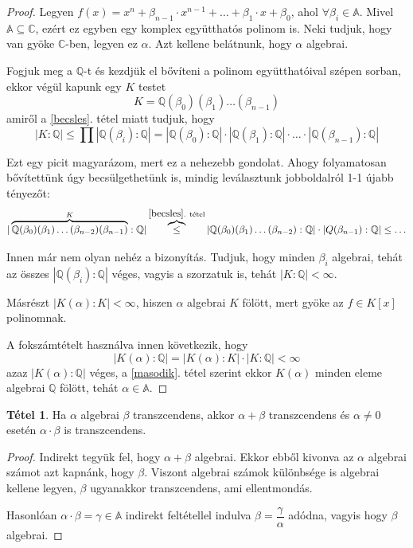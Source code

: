 \documentclass[12pt]{book}
\theoremstyle{plain} %
\theoremstyle{definition} %
\newtheorem{theo/}{Tétel}[section]
\newenvironment{theo}
  {\renewcommand{\qedsymbol}{$\clubsuit$}%
   \pushQED{\qed}\begin{theo/}}
  {\popQED\end{theo/}}
\theoremstyle{remark}
\renewcommand\qedsymbol{$\blacksquare$}
\numberwithin{equation}{section}  %
\begin{document}
\begin{proof}
		Legyen $f(x)=x^n+\beta_{n-1}\cdot x^{n-1} + \ldots + \beta_1 \cdot x + \beta_0$, ahol $\forall \beta_i \in \mathbb{A}$. Mivel $\mathbb{A} \subseteq \mathbb{C}$, ezért ez egyben egy komplex együtthatós polinom is. Neki tudjuk, hogy van gyöke $\mathbb{C}$-ben, legyen ez $\alpha$. Azt kellene belátnunk, hogy $\alpha$ algebrai.
		
		Fogjuk meg a $\mathbb{Q}$-t és kezdjük el bővíteni a polinom együtthatóival szépen sorban, ekkor végül kapunk egy $K$ testet
		\[ K = \mathbb{Q}(\beta_0)(\beta_1)\ldots(\beta_{n-1})   \]
		amiről a \ref{becsles}. tétel miatt tudjuk, hogy
		\[ |K:\mathbb{Q}| \leq \prod |\mathbb{Q}(\beta_i):\mathbb{Q}| = |\mathbb{Q}(\beta_0):\mathbb{Q}|\cdot |\mathbb{Q}(\beta_1):\mathbb{Q}|\cdot \ldots \cdot |\mathbb{Q}(\beta_{n-1}):\mathbb{Q}|  \]
		
		Ezt egy picit magyarázom, mert ez a nehezebb gondolat. Ahogy folyamatosan bővítettünk úgy becsülgethetünk is, mindig leválasztunk jobboldalról 1-1 újabb tényezőt:
		\[ |\overbrace{\mathbb{Q}(\beta_0)(\beta_1)\ldots (\beta_{n-2})(\beta_{n-1})}^{K}:\mathbb{Q}| \overbrace{\leq}^{\ref{becsles} \text{. tétel}} |\mathbb{Q}(\beta_0)(\beta_1)\ldots (\beta_{n-2}):\mathbb{Q}|\cdot |Q(\beta_{n-1}):\mathbb{Q}| \leq \ldots  \]
		
		Innen már nem olyan nehéz a bizonyítás. Tudjuk, hogy minden $\beta_i$ algebrai, tehát az összes $|\mathbb{Q}(\beta_i):\mathbb{Q}|$ véges, vagyis a szorzatuk is, tehát $|K: \mathbb{Q}|<\infty$.
		
		Másrészt $|K(\alpha): K|<\infty$, hiszen $\alpha$ algebrai $K$ fölött, mert gyöke az $f\in K[x]$ polinomnak. 
		
		A fokszámtételt használva innen következik, hogy
		\[ |K(\alpha) : \mathbb{Q}| = |K(\alpha):K| \cdot |K:\mathbb{Q}| < \infty  \]
		azaz $|K(\alpha):\mathbb{Q}|$ véges, a \ref{masodik}. tétel szerint ekkor $K(\alpha)$ minden eleme algebrai $\mathbb{Q}$ fölött, tehát $\alpha \in \mathbb{A}$.
	\end{proof}

	\begin{theo}
		Ha $\alpha$ algebrai $\beta$ transzcendens, akkor $\alpha+\beta$ transzcendens és $\alpha\neq 0$ esetén $\alpha\cdot \beta$ is transzcendens.
	\end{theo}

	\begin{proof}
		Indirekt tegyük fel, hogy $\alpha+\beta$ algebrai. Ekkor ebből kivonva az $\alpha$ algebrai számot azt kapnánk, hogy $\beta$. Viszont algebrai számok különbsége is algebrai kellene legyen, $\beta$ ugyanakkor transzcendens, ami ellentmondás.
		
		Hasonlóan $\alpha \cdot \beta = \gamma\in \mathbb{A}$ indirekt feltétellel indulva $ \beta = \dfrac{\gamma}{\alpha}$	adódna, vagyis hogy $\beta$ algebrai.
	\end{proof}
\end{document}
